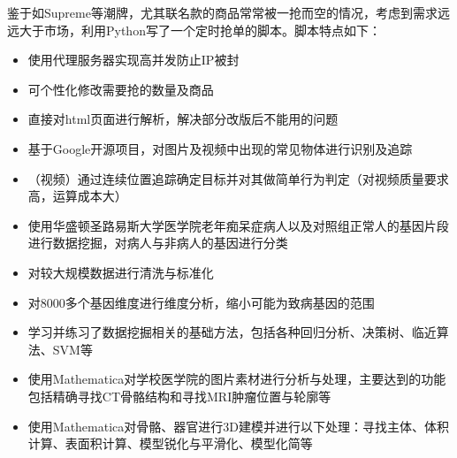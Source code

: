 \documentclass[9pt,a4paper]{altacv}
\begin{document}
\begin{fullwidth}
\begin{multicols}{2}
		\divider
		
		鉴于如Supreme等潮牌，尤其联名款的商品常常被一抢而空的情况，考虑到需求远远大于市场，利用Python写了一个定时抢单的脚本。脚本特点如下：
		\begin{itemize}
			\item 使用代理服务器实现高并发防止IP被封
			\item 可个性化修改需要抢的数量及商品
			\item 直接对html页面进行解析，解决部分改版后不能用的问题
		\end{itemize}
		
		\columnbreak
		
		\begin{itemize}
			\item 基于Google开源项目，对图片及视频中出现的常见物体进行识别及追踪
			\item （视频）通过连续位置追踪确定目标并对其做简单行为判定（对视频质量要求高，运算成本大）
		\end{itemize}
		
		\divider
		
		\begin{itemize}
			\item 使用华盛顿圣路易斯大学医学院老年痴呆症病人以及对照组正常人的基因片段进行数据挖掘，对病人与非病人的基因进行分类
			\item 对较大规模数据进行清洗与标准化
			\item 对8000多个基因维度进行维度分析，缩小可能为致病基因的范围
			\item 学习并练习了数据挖掘相关的基础方法，包括各种回归分析、决策树、临近算法、SVM等
		\end{itemize}
		
		\divider
		
		\begin{itemize}
			\item 使用Mathematica对学校医学院的图片素材进行分析与处理，主要达到的功能包括精确寻找CT骨骼结构和寻找MRI肿瘤位置与轮廓等
			\item 使用Mathematica对骨骼、器官进行3D建模并进行以下处理：寻找主体、体积计算、表面积计算、模型锐化与平滑化、模型化简等
		\end{itemize}
		

\end{multicols}
\end{fullwidth}
\end{document}
